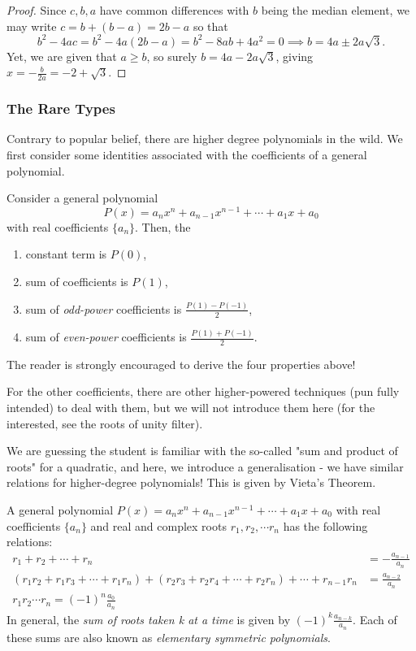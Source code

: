 \documentclass[../main.tex]{subfiles}
\begin{document}
\begin{proof}
    Since $c,b,a$ have common differences with $b$ being the median element, we may write $c=b+(b-a)=2b-a$ so that 
$$b^2-4ac=b^2-4a(2b-a)=b^2-8ab+4a^2=0 \implies b=4a\pm2a\sqrt{3}.$$
Yet, we are given that $a\geq b$, so surely $b=4a-2a\sqrt{3}$, giving $x=-\frac{b}{2a}=\boxed{-2+\sqrt{3}}.$
\end{proof}

\subsubsection{The Rare Types}
Contrary to popular belief, there are higher degree polynomials in the wild. We first consider some identities associated with the coefficients of a general polynomial.

Consider a general polynomial $$P(x)=a_nx^n+a_{n-1}x^{n-1}+\cdots+a_1x+a_0$$ with real coefficients $\{a_n\}$. Then, the
\begin{enumerate}
    \item constant term is $P(0)$,
    \item sum of coefficients is $P(1)$,
    \item sum of \textit{odd-power} coefficients is $\frac{P(1)-P(-1)}{2}$,
    \item sum of \textit{even-power} coefficients is $\frac{P(1)+P(-1)}{2}$.
\end{enumerate}

The reader is strongly encouraged to derive the four properties above!

For the other coefficients, there are other higher-powered techniques (pun fully intended) to deal with them, but we will not introduce them here (for the interested, see the roots of unity filter).

We are guessing the student is familiar with the so-called "sum and product of roots" for a quadratic, and here, we introduce a generalisation - we have similar relations for higher-degree polynomials! This is given by Vieta's Theorem.

\begin{proposition}
    A general polynomial $P(x)=a_nx^n+a_{n-1}x^{n-1}+\cdots+a_1x+a_0$ with real coefficients $\{a_n\}$ and real and complex roots $r_1, r_2, \cdots r_n$ has the following relations:
    \begin{align*}
        r_1+r_2+\cdots+r_n&=-\frac{a_{n-1}}{a_n}\\
        (r_1r_2+r_1r_3+\cdots+r_1r_n)+(r_2r_3+r_2r_4+\cdots+r_2r_n)+\cdots+r_{n-1}r_n&=\frac{a_{n-2}}{a_n} \\
        r_1r_2\cdots r_n=(-1)^n\frac{a_0}{a_n}
    \end{align*}
    In general, the \textit{sum of roots taken k at a time} is given by $(-1)^k\frac{a_{n-k}}{a_n}.$ Each of these sums are also known as \textit{elementary symmetric polynomials}.
\end{proposition}
\end{document}
